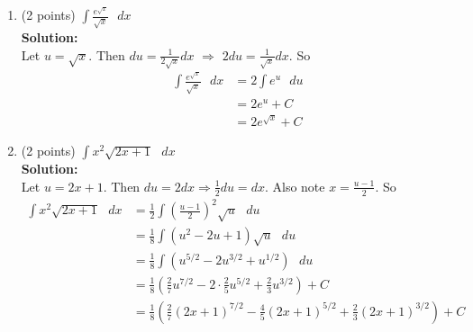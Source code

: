 \documentclass[paper=a4, fontsize=11pt]{scrartcl} %
\numberwithin{equation}{section} %
\numberwithin{figure}{section} %
\numberwithin{table}{section} %
\begin{document}
\begin{enumerate}
\setlength{\itemsep}{0.45in}
\item (2 points) $\displaystyle \int \frac{e^{\sqrt{x}}}{\sqrt{x}} \text{ } dx$\\
\noindent\textbf{Solution:}\\
Let $u = \sqrt{x}$.  Then $du = \frac{1}{2\sqrt{x}}dx$ $\Longrightarrow$ $2 du = \frac{1}{\sqrt{x}} dx$.  So
\begin{align*}
\int \frac{e^{\sqrt{x}}}{\sqrt{x}} \text{ } dx &= 2 \int e^u \text{ } du\\
&=2e^u + C\\
&= \boxed{2e^{\sqrt{x}} + C}
\end{align*}
\vspace{1.5in}
\item (2 points) $\displaystyle \int x^2\sqrt{2x+1} \text{ } dx$\\
\noindent\textbf{Solution:}\\
Let $u = 2x+1$.  Then $du = 2 dx \Longrightarrow \frac{1}{2} du = dx$.  Also note $x = \frac{u-1}{2}$.  So
\begin{align*}
\int x^2\sqrt{2x+1} \text{ } dx &= \frac{1}{2}\int \left(\frac{u-1}{2}\right)^2\sqrt{u} \text{ } du\\
&= \frac{1}{8}\int (u^2 -2u+1)\sqrt{u} \text{ } du\\
&= \frac{1}{8}\int (u^{5/2} - 2u^{3/2} + u^{1/2})\text{ } du\\
&= \frac{1}{8}\left(\frac{2}{7}u^{7/2}-2\cdot \frac{2}{5}u^{5/2} + \frac{2}{3}u^{3/2} \right) + C \\
&= \boxed{\frac{1}{8}\left(\frac{2}{7}(2x+1)^{7/2}-\frac{4}{5}(2x+1)^{5/2} + \frac{2}{3}(2x+1)^{3/2} \right) + C}
\end{align*}

\newpage


\end{enumerate}
\end{document}
